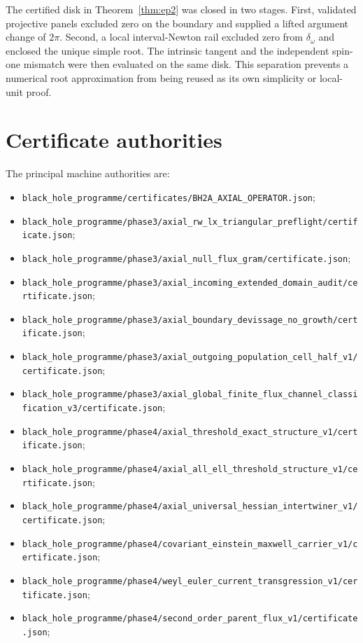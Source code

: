 \documentclass[11pt]{article}
\theoremstyle{definition}
\theoremstyle{remark}
\newcommand{\cert}[1]{\nolinkurl{#1}}
\begin{document}
The certified disk in Theorem~\ref{thm:ep2} was closed in two stages.  First,
validated projective panels excluded zero on the boundary and supplied a
lifted argument change of \(2\pi\).  Second, a local interval-Newton rail
excluded zero from \(\delta_\omega\) and enclosed the unique simple root.
The intrinsic tangent and the independent spin-one mismatch were then
evaluated on the same disk.  This separation prevents a numerical root
approximation from being reused as its own simplicity or local-unit proof.

\section{Certificate authorities}

The principal machine authorities are:
\begin{itemize}
\item \cert{black_hole_programme/certificates/BH2A_AXIAL_OPERATOR.json};
\item \cert{black_hole_programme/phase3/axial_rw_lx_triangular_preflight/certificate.json};
\item \cert{black_hole_programme/phase3/axial_null_flux_gram/certificate.json};
\item \cert{black_hole_programme/phase3/axial_incoming_extended_domain_audit/certificate.json};
\item \cert{black_hole_programme/phase3/axial_boundary_devissage_no_growth/certificate.json};
\item \cert{black_hole_programme/phase3/axial_outgoing_population_cell_half_v1/certificate.json};
\item \cert{black_hole_programme/phase3/axial_global_finite_flux_channel_classification_v3/certificate.json};
\item \cert{black_hole_programme/phase4/axial_threshold_exact_structure_v1/certificate.json};
\item \cert{black_hole_programme/phase4/axial_all_ell_threshold_structure_v1/certificate.json};
\item \cert{black_hole_programme/phase4/axial_universal_hessian_intertwiner_v1/certificate.json};
\item \cert{black_hole_programme/phase4/covariant_einstein_maxwell_carrier_v1/certificate.json};
\item \cert{black_hole_programme/phase4/weyl_euler_current_transgression_v1/certificate.json};
\item \cert{black_hole_programme/phase4/second_order_parent_flux_v1/certificate.json};

\end{itemize}
\end{document}
